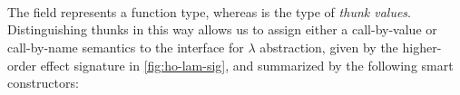 \begin{code}%
%
\>[2]\AgdaSpace{}%
\AgdaSpace{}%
\AgdaSymbol{:}\AgdaSpace{}%
\AgdaSpace{}%
\<%
\\
\>[2][@{}l@{\AgdaIndent{0}}]%
\>[4]%
\>[11]\AgdaSpace{}%
\AgdaSpace{}%
%
\>[18]\AgdaSymbol{:}\AgdaSpace{}%
\<%
\\
%
\>[11]%
\>[18]\AgdaSymbol{:}\AgdaSpace{}%
\AgdaSpace{}%
\AgdaSpace{}%
\AgdaSpace{}%
\AgdaSpace{}%
\<%
\\
%
\>[11]%
\>[18]\AgdaSymbol{:}\AgdaSpace{}%
\AgdaSpace{}%
\AgdaSpace{}%
\<%
\end{code}
%
The  field represents a function type, whereas  is the type of \emph{thunk values}.
Distinguishing thunks in this way allows us to assign either a call-by-value or call-by-name semantics to the interface for $\lambda$ abstraction, given by the higher-order effect signature in \cref{fig:ho-lam-sig}, and summarized by the following smart constructors:
%
